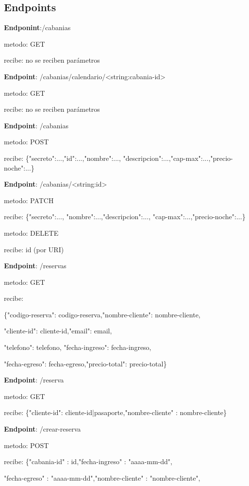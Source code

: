 \subsection{Endpoints}


\textbf{Endponint}:/cabanias

metodo: GET

recibe: no se reciben parámetros


\textbf{Endpoint}: /cabanias/calendario/<string:cabania-id>

metodo: GET

recibe: no se reciben parámetros


\textbf{Endpoint}: /cabanias

metodo: POST 

recibe:
\{"secreto":...,"id":...,"nombre":..., \newline
"descripcion":...,"cap-max":...,"precio-noche":...\}


\textbf{Endpoint}: /cabanias/<string:id>

metodo: PATCH 

recibe: \{"secreto":...,
"nombre":...,"descripcion":...,
"cap-max":...,"precio-noche":...\}

metodo: DELETE

recibe: id (por URI)




\textbf{Endpoint}: /reservas

metodo: GET

recibe:

\{"codigo-reserva": codigo-reserva,"nombre-cliente": nombre-cliente,

"cliente-id": cliente-id,"email": email,

"telefono": telefono, "fecha-ingreso": fecha-ingreso,

"fecha-egreso": fecha-egreso,"precio-total": precio-total\}


\textbf{Endpoint}: /reserva

metodo: GET

recibe: \{"cliente-id": cliente-id|pasaporte,"nombre-cliente" : nombre-cliente\}


\textbf{Endpoint}: /crear-reserva

metodo: POST

recibe: \{"cabania-id" : id,"fecha-ingreso" : "aaaa-mm-dd",

"fecha-egreso" : "aaaa-mm-dd","nombre-cliente" : "nombre-cliente",

